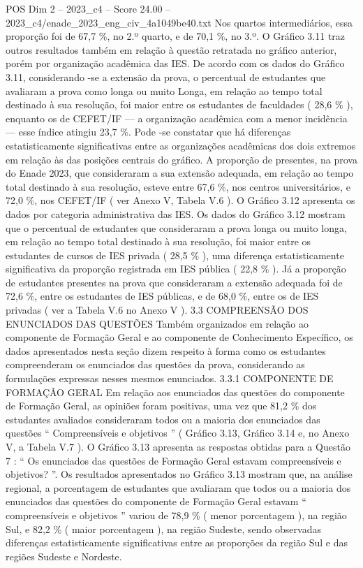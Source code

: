 \begin{textsample}{POS Dim 2 – 2023\_c4 – Score 24.00 – 2023\_c4/enade\_2023\_eng\_civ\_4a1049be40.txt}
Nos quartos intermediários, essa proporção foi de 67,7 \%, no 2.º quarto, e de 70,1 \%, no 3.º.
O Gráfico 3.11 traz outros resultados também em relação à questão retratada no gráfico anterior, porém por organização acadêmica das IES.
De acordo com os dados do Gráfico 3.11, considerando -se a extensão da prova, o percentual de estudantes que avaliaram a prova como longa ou muito Longa, em relação ao tempo total destinado à sua resolução, foi maior entre os estudantes de faculdades ( 28,6 \% ), enquanto os de CEFET/IF — a organização acadêmica com a menor incidência — esse índice atingiu 23,7 \%.
Pode -se constatar que há diferenças estatisticamente significativas entre as organizações acadêmicas dos dois extremos em relação às das posições centrais do gráfico.
A proporção de presentes, na prova do Enade 2023, que consideraram a sua extensão adequada, em relação ao tempo total destinado à sua resolução, esteve entre 67,6 \%, nos centros universitários, e 72,0 \%, nos CEFET/IF ( ver Anexo V, Tabela V.6 ).
O Gráfico 3.12 apresenta os dados por categoria administrativa das IES.
Os dados do Gráfico 3.12 mostram que o percentual de estudantes que consideraram a prova longa ou muito longa, em relação ao tempo total destinado à sua resolução, foi maior entre os estudantes de cursos de IES privada ( 28,5 \% ), uma diferença estatisticamente significativa da proporção registrada em IES pública ( 22,8 \% ).
Já a proporção de estudantes presentes na prova que consideraram a extensão adequada foi de 72,6 \%, entre os estudantes de IES públicas, e de 68,0 \%, entre os de IES privadas ( ver a Tabela V.6 no Anexo V ). 3.3 COMPREENSÃO DOS ENUNCIADOS DAS QUESTÕES Também organizados em relação ao componente de Formação Geral e ao componente de Conhecimento Específico, os dados apresentados nesta seção dizem respeito à forma como os estudantes compreenderam os enunciados das questões da prova, considerando as formulações expressas nesses mesmos enunciados. 3.3.1 COMPONENTE DE FORMAÇÃO GERAL Em relação aos enunciados das questões do componente de Formação Geral, as opiniões foram positivas, uma vez que 81,2 \% dos estudantes avaliados consideraram todos ou a maioria dos enunciados das questões “ Compreensíveis e objetivos ” ( Gráfico 3.13, Gráfico 3.14 e, no Anexo V, a Tabela V.7 ).
O Gráfico 3.13 apresenta as respostas obtidas para a Questão 7 : “ Os enunciados das questões de Formação Geral estavam compreensíveis e objetivos? ”.
Os resultados apresentados no Gráfico 3.13 mostram que, na análise regional, a porcentagem de estudantes que avaliaram que todos ou a maioria dos enunciados das questões do componente de Formação Geral estavam “ compreensíveis e objetivos ” variou de 78,9 \% ( menor porcentagem ), na região Sul, e 82,2 \% ( maior porcentagem ), na região Sudeste, sendo observadas diferenças estatisticamente significativas entre as proporções da região Sul e das regiões Sudeste e Nordeste.

\end{textsample}

